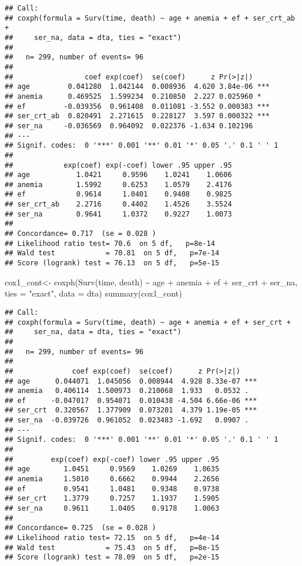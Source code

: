 \documentclass[
]{article}
\newenvironment{Shaded}{\begin{snugshade}}{\end{snugshade}}
\newcommand{\AttributeTok}[1]{\textcolor[rgb]{0.77,0.63,0.00}{#1}}
\newcommand{\FunctionTok}[1]{\textcolor[rgb]{0.00,0.00,0.00}{#1}}
\newcommand{\NormalTok}[1]{#1}
\newcommand{\OtherTok}[1]{\textcolor[rgb]{0.56,0.35,0.01}{#1}}
\newcommand{\SpecialCharTok}[1]{\textcolor[rgb]{0.00,0.00,0.00}{#1}}
\newcommand{\StringTok}[1]{\textcolor[rgb]{0.31,0.60,0.02}{#1}}
\begin{document}
\begin{verbatim}
## Call:
## coxph(formula = Surv(time, death) ~ age + anemia + ef + ser_crt_ab + 
##     ser_na, data = dta, ties = "exact")
## 
##   n= 299, number of events= 96 
## 
##                 coef exp(coef)  se(coef)      z Pr(>|z|)    
## age         0.041280  1.042144  0.008936  4.620 3.84e-06 ***
## anemia      0.469525  1.599234  0.210850  2.227 0.025960 *  
## ef         -0.039356  0.961408  0.011081 -3.552 0.000383 ***
## ser_crt_ab  0.820491  2.271615  0.228127  3.597 0.000322 ***
## ser_na     -0.036569  0.964092  0.022376 -1.634 0.102196    
## ---
## Signif. codes:  0 '***' 0.001 '**' 0.01 '*' 0.05 '.' 0.1 ' ' 1
## 
##            exp(coef) exp(-coef) lower .95 upper .95
## age           1.0421     0.9596    1.0241    1.0606
## anemia        1.5992     0.6253    1.0579    2.4176
## ef            0.9614     1.0401    0.9408    0.9825
## ser_crt_ab    2.2716     0.4402    1.4526    3.5524
## ser_na        0.9641     1.0372    0.9227    1.0073
## 
## Concordance= 0.717  (se = 0.028 )
## Likelihood ratio test= 70.6  on 5 df,   p=8e-14
## Wald test            = 70.81  on 5 df,   p=7e-14
## Score (logrank) test = 76.13  on 5 df,   p=5e-15
\end{verbatim}

\begin{Shaded}
\begin{Highlighting}[]
\NormalTok{cox1\_cont}\OtherTok{\textless{}{-}} \FunctionTok{coxph}\NormalTok{(}\FunctionTok{Surv}\NormalTok{(time, death) }\SpecialCharTok{\textasciitilde{}}\NormalTok{ age }\SpecialCharTok{+}\NormalTok{ anemia }\SpecialCharTok{+}\NormalTok{ ef }\SpecialCharTok{+}\NormalTok{ ser\_crt }\SpecialCharTok{+}\NormalTok{ ser\_na, }\AttributeTok{ties =} \StringTok{"exact"}\NormalTok{, }\AttributeTok{data =}\NormalTok{ dta)}
\FunctionTok{summary}\NormalTok{(cox1\_cont)}
\end{Highlighting}
\end{Shaded}

\begin{verbatim}
## Call:
## coxph(formula = Surv(time, death) ~ age + anemia + ef + ser_crt + 
##     ser_na, data = dta, ties = "exact")
## 
##   n= 299, number of events= 96 
## 
##              coef exp(coef)  se(coef)      z Pr(>|z|)    
## age      0.044071  1.045056  0.008944  4.928 8.33e-07 ***
## anemia   0.406114  1.500973  0.210068  1.933   0.0532 .  
## ef      -0.047017  0.954071  0.010438 -4.504 6.66e-06 ***
## ser_crt  0.320567  1.377909  0.073201  4.379 1.19e-05 ***
## ser_na  -0.039726  0.961052  0.023483 -1.692   0.0907 .  
## ---
## Signif. codes:  0 '***' 0.001 '**' 0.01 '*' 0.05 '.' 0.1 ' ' 1
## 
##         exp(coef) exp(-coef) lower .95 upper .95
## age        1.0451     0.9569    1.0269    1.0635
## anemia     1.5010     0.6662    0.9944    2.2656
## ef         0.9541     1.0481    0.9348    0.9738
## ser_crt    1.3779     0.7257    1.1937    1.5905
## ser_na     0.9611     1.0405    0.9178    1.0063
## 
## Concordance= 0.725  (se = 0.028 )
## Likelihood ratio test= 72.15  on 5 df,   p=4e-14
## Wald test            = 75.43  on 5 df,   p=8e-15
## Score (logrank) test = 78.09  on 5 df,   p=2e-15
\end{verbatim}
\end{document}
